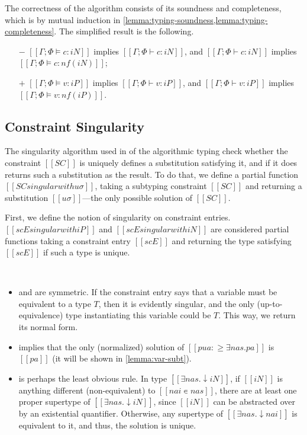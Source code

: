 \documentclass[acmsmall,natbib=false,review,anonymous]{acmart}
\begin{document}
The correctness of the algorithm consists of its soundness and 
completeness, which is by mutual
induction in \cref{lemma:typing-soundness,lemma:typing-completeness}.
The simplified result is the following.
\begin{theorempreview}
  \hfill
  \begin{itemize}
    \item [$-$] $[[Γ; Φ ⊨ c : iN]]$ implies $[[Γ; Φ ⊢ c : iN]]$, 
      and $[[Γ; Φ ⊢ c : iN]]$ implies $[[Γ; Φ ⊨ c : nf(iN)]]$;
    \item [$+$] $[[Γ; Φ ⊨ v : iP]]$ implies $[[Γ; Φ ⊢ v : iP]]$, 
      and $[[Γ; Φ ⊢ v : iP]]$ implies $[[Γ; Φ ⊨ v : nf(iP)]]$.
  \end{itemize}
\end{theorempreview}


\subsection{Constraint Singularity}
\label{sec:constraint-singularity}

The singularity algorithm used in  
of the algorithmic typing check whether the constraint $[[SC]]$
is uniquely defines a substitution satisfying it, and if it does
returns such a substitution as the result.
To do that, we define a partial function $[[SC singular with uσ]]$,
taking a subtyping constraint $[[SC]]$ and returning a substitution 
$[[uσ]]$---the only possible solution of $[[SC]]$. 

First, we define the notion of singularity on constraint entries. 
$[[scE singular with iP]]$ and $[[scE singular with iN]]$
are considered partial functions taking a constraint entry $[[scE]]$
and returning the type satisfying $[[scE]]$ if such a type is unique. 

\begin{algorithm}
  \hfill\\
  \ottdefnSINGscEP{}
  \ottdefnSINGscEN{}
\end{algorithm}

\begin{itemize}
  \item {} and  
    are symmetric. If the constraint entry says that a variable must be equivalent to 
    a type $T$, then it is evidently singular, and the only (up-to-equivalence) type
    instantiating this variable could be $T$. This way, we return its normal form. 
  \item {}
    implies that the only (normalized) solution of $[[pua :≥ ∃nas.pa]]$ is 
    $[[pa]]$ (it will be shown in \cref{lemma:var-subt}).
  \item {}
    is perhaps the least obvious rule.
    In type $[[∃nas.↓iN]]$, if $[[iN]]$ is anything different (non-equivalent) to 
    $[[nai ∊ {nas}]]$, there are at least 
    one proper supertype of $[[∃nas.↓iN]]$, since $[[iN]]$ can be abstracted over
    by an existential quantifier. Otherwise, any supertype of $[[∃nas.↓nai]]$
    is equivalent to it, and thus, the solution is unique. 
\end{itemize}
\end{document}
